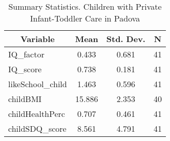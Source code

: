 
\begin{table}[htbp]\centering \caption{Summary Statistics. Children with Private Infant-Toddler Care in Padova \label{bothChildasiloPrivPadova}}
\begin{tabular}{l c c  c}\hline\hline
\multicolumn{1}{c}{\textbf{Variable}} & \textbf{Mean}
 & \textbf{Std. Dev.} & \textbf{N}\\ \hline
IQ\_factor & 0.433 & 0.681  & 41\\
IQ\_score & 0.738 & 0.181  & 41\\
likeSchool\_child & 1.463 & 0.596  & 41\\
childBMI & 15.886 & 2.353  & 40\\
childHealthPerc & 0.707 & 0.461  & 41\\
childSDQ\_score & 8.561 & 4.791  & 41\\
\hline\end{tabular}
\end{table}
